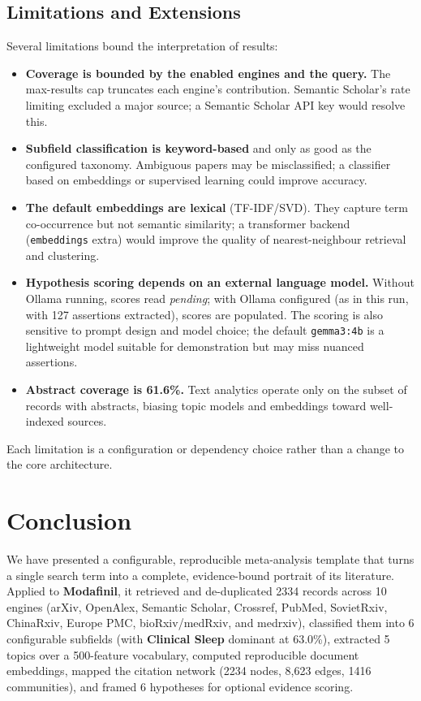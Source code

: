 \documentclass[
  english,
]{article}
\begin{document}
\subsection{Limitations and
Extensions}\label{limitations-and-extensions}

Several limitations bound the interpretation of results:

\begin{itemize}
\item
  \textbf{Coverage is bounded by the enabled engines and the query.} The
  max-results cap truncates each engine's contribution. Semantic
  Scholar's rate limiting excluded a major source; a Semantic Scholar
  API key would resolve this.
\item
  \textbf{Subfield classification is keyword-based} and only as good as
  the configured taxonomy. Ambiguous papers may be misclassified; a
  classifier based on embeddings or supervised learning could improve
  accuracy.
\item
  \textbf{The default embeddings are lexical} (TF-IDF/SVD). They capture
  term co-occurrence but not semantic similarity; a transformer backend
  (\texttt{embeddings} extra) would improve the quality of
  nearest-neighbour retrieval and clustering.
\item
  \textbf{Hypothesis scoring depends on an external language model.}
  Without Ollama running, scores read \emph{pending}; with Ollama
  configured (as in this run, with 127 assertions extracted), scores are
  populated. The scoring is also sensitive to prompt design and model
  choice; the default \texttt{gemma3:4b} is a lightweight model suitable
  for demonstration but may miss nuanced assertions.
\item
  \textbf{Abstract coverage is 61.6\%.} Text analytics operate only on
  the subset of records with abstracts, biasing topic models and
  embeddings toward well-indexed sources.
\end{itemize}

Each limitation is a configuration or dependency choice rather than a
change to the core architecture.

\newpage

\section{Conclusion}\label{conclusion}

We have presented a configurable, reproducible meta-analysis template
that turns a single search term into a complete, evidence-bound portrait
of its literature. Applied to \textbf{Modafinil}, it retrieved and
de-duplicated 2334 records across 10 engines (arXiv, OpenAlex, Semantic
Scholar, Crossref, PubMed, SovietRxiv, ChinaRxiv, Europe PMC,
bioRxiv/medRxiv, and medrxiv), classified them into 6 configurable
subfields (with \textbf{Clinical Sleep} dominant at 63.0\%), extracted 5
topics over a 500-feature vocabulary, computed reproducible document
embeddings, mapped the citation network (2234 nodes, 8,623 edges, 1416
communities), and framed 6 hypotheses for optional evidence scoring.
\end{document}
